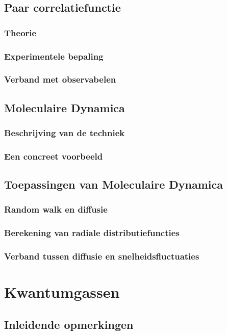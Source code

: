 \documentclass[a4paper,twoside]{article}
\theoremstyle{definition}
\theoremstyle{plain}
\begin{document}
\subsection{Paar correlatiefunctie}
\subsubsection{Theorie}
\subsubsection{Experimentele bepaling}
\subsubsection{Verband met observabelen}
\subsection{Moleculaire Dynamica}
\subsubsection{Beschrijving van de techniek}
\subsubsection{Een concreet voorbeeld}
\subsection{Toepassingen van Moleculaire Dynamica}
\subsubsection{Random walk en diffusie}
\subsubsection{Berekening van radiale distributiefuncties}
\subsubsection{Verband tussen diffusie en snelheidsfluctuaties}

\section{Kwantumgassen}
\subsection{Inleidende opmerkingen}
\end{document}
